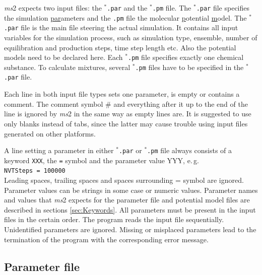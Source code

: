 \textit{ms}2 expects two input files: the \texttt{$^{*}$\hspace{-3pt}.par} and the \texttt{$^{*}$\hspace{-3pt}.pm} file. The \texttt{$^{*}$\hspace{-3pt}.par} file specifies the simulation \underline{par}ameters and the \texttt{.pm} file the molecular \underline{p}otential \underline{m}odel. The \texttt{$^{*}$\hspace{-3pt}.par} file is the main file steering the actual simulation. It contains all input variables for the simulation process, such as simulation type, ensemble, number of equilibration and production steps, time step length etc. Also the potential models need to be declared here. Each \texttt{$^{*}$\hspace{-3pt}.pm} file specifies exactly one chemical substance. To calculate mixtures, several \texttt{$^{*}$\hspace{-3pt}.pm} files have to be specified in the \texttt{$^{*}$\hspace{-3pt}.par} file.

Each line in both input file types sets one parameter, is empty or contains a comment. The comment symbol $\#$ and everything after it up to the end of the line is ignored by \textit{ms}2 in the same way as empty lines are. It is suggested to use only blanks instead of tabs, since the latter may cause trouble using input files generated on other platforms. 

A line setting a parameter in either \texttt{$^{*}$\hspace{-3pt}.par} or \texttt{$^{*}$\hspace{-3pt}.pm} file always consists of a keyword \texttt{XXX}, the \texttt{=} symbol and the parameter value YYY, e.\,g. \\
\texttt{NVTSteps  =  100000}\\
Leading spaces, trailing spaces and spaces surrounding = symbol are ignored. Parameter values can be strings in some case or numeric values. Parameter names and values that \textit{ms}2 expects for the parameter file and potential model files are described in sections \ref{sec:Keywords}. All parameters must be present in the input files in the certain order. The program reads the input file sequentially. %
Unidentified parameters are ignored. Missing or misplaced parameters lead to the termination of the program with the corresponding error message.


\subsection{Parameter file}
\label{sec:par - file}


